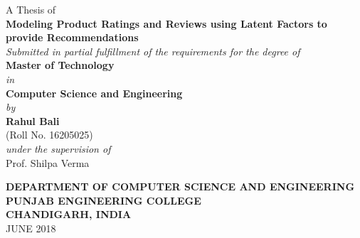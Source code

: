 \documentclass[12pt,a4paper]{memoir}
\begin{document}
%
%


\thispagestyle{empty}
{\centering
    {{A Thesis of}\\}
    \vspace{0.1cm}
    {\Large\textbf{Modeling Product Ratings and Reviews using Latent Factors to provide Recommendations}\\}
    \vspace{1cm}
    {\textit{Submitted in partial fulfillment of the requirements for the degree of}\\}
    \vspace{0.5cm}
    {\textbf{Master of Technology}}
    \\\textit{in}
    \\{\textbf{Computer Science and Engineering}}
    \vspace{1cm}
    \\{\textit{by}}\\
    \vspace{0.2cm}
    {\large \textbf{Rahul Bali}} \\ (Roll No. 16205025)\\
    \vspace{1.5cm}
    {\textit{under the supervision of}} \\
    \vspace{0.2cm}
    { Prof. Shilpa Verma }\\
    \vspace {0.7cm}
    \begin{figure}[h]
        {\par}
    \end{figure}
    \vspace{0.5cm}
    {\normalsize{\textbf{DEPARTMENT OF COMPUTER SCIENCE AND ENGINEERING}}}\\
    \vspace{0.3cm}
    {\textbf{PUNJAB ENGINEERING COLLEGE\\}}
    {\textbf{CHANDIGARH, INDIA\\}}
    \vspace{.2 cm}
    {JUNE 2018}\\
}
\end{document}
